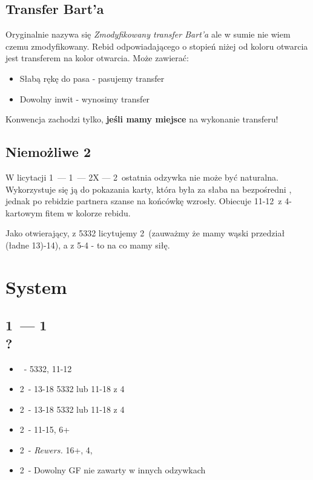 \documentclass[12pt, a4paper]{article}
\begin{document}
    \subsection{Transfer Bart'a}
    Oryginalnie nazywa się \emph{Zmodyfikowany transfer Bart'a} ale w sumie nie wiem czemu zmodyfikowany.
    Rebid odpowiadającego o stopień niżej od koloru otwarcia jest transferem na kolor otwarcia.
    Może zawierać:
    \begin{itemize}
        \item Słabą rękę do pasa - pasujemy transfer
        \item Dowolny inwit - wynosimy transfer
    \end{itemize}
    Konwencja zachodzi tylko, \textbf{jeśli mamy miejsce} na wykonanie transferu!

    \subsection{Niemożliwe 2\spades}
    W licytacji 1\hearts\ --- 1\nt\ --- 2X --- 2\spades\ ostatnia odzywka nie może być naturalna.
    Wykorzystuje się ją do pokazania karty, która była za słaba na bezpośredni \gf, jednak
    po rebidzie partnera szanse na końcówkę wzrosły.
    Obiecuje 11-12\hcp\ z 4-kartowym fitem w kolorze rebidu.
    
    Jako otwierający, z 5332 licytujemy 2\nt\ (zauważmy że mamy wąski przedział (ładne 13)-14),
    a z 5-4 - to na co mamy siłę.

    \pagebreak
    \section{System}
    \subsection{1\hearts\ --- 1\ntx \\ ?}
    \begin{itemize}
        \item \pass\ - 5332, 11-12
        \item 2\clubs\ - 13-18 5332 lub 11-18 z 4\clubs
        \item 2\diams\ - 13-18 5332 lub 11-18 z 4\diams 
        \item 2\hearts\ - 11-15, 6+\hearts 
        \item 2\spades\ - \emph{Rewers.} 16+, 4\spades, \fonce 
        \item 2\nt\ - Dowolny GF nie zawarty w innych odzywkach \gf 
    \end{itemize}
\end{document}
